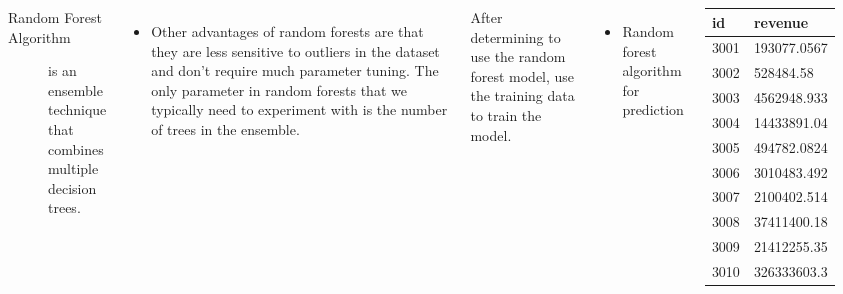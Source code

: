\documentclass{tikzposter} %
\begin{document}
\begin{columns}
{}



{
\begin{description}
  	\item[Random Forest Algorithm] is an ensemble technique that combines multiple decision trees. 
    
\end{description}
    \begin{itemize}
      \item Other advantages of random forests are that they are less sensitive to outliers in the dataset 
      and don’t require much parameter tuning.   
      The only parameter in random forests that we typically 
      need to experiment with is the number of trees in the ensemble.
    \end{itemize}

}

{
  After determining to use the random forest model, use the training data to train the model.

\begin{itemize}
  \item Random forest algorithm for prediction
\end{itemize}

\begin{tabular}{ p{100pt} | p{250pt} }
  \toprule
  id & revenue\\
  \midrule
  3001 & 193077.0567 \\
  3002 &  528484.58  \\
  3003 &  4562948.933\\
  3004 & 14433891.04\\
  3005 &  494782.0824 \\
  3006 &  3010483.492 \\
  3007 &  2100402.514 \\
  3008 &  37411400.18 \\
  3009 & 21412255.35  \\
  3010 &  326333603.3 \\
  \bottomrule
\end{tabular}
}


\end{columns}
\end{document}
